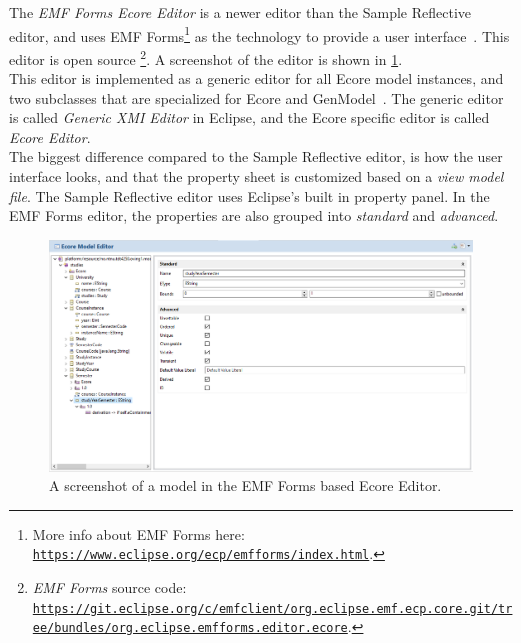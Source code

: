 The \textit{EMF Forms Ecore Editor} is a newer editor than the Sample Reflective editor, and uses EMF Forms\footnote{More info about EMF Forms here: \href{https://www.eclipse.org/ecp/emfforms/index.html}{\nolinkurl{https://www.eclipse.org/ecp/emfforms/index.html}}.} as the technology to provide a user interface~\cite{eclipsesourceEMFFormsEditors2016}.
This editor is \gls{open source}%
\footnote{\textit{EMF Forms} source code: \href{https://git.eclipse.org/c/emfclient/org.eclipse.emf.ecp.core.git/tree/bundles/org.eclipse.emfforms.editor.ecore}{\nolinkurl{https://git.eclipse.org/c/emfclient/org.eclipse.emf.ecp.core.git/tree/bundles/org.eclipse.emfforms.editor.ecore}}.}.
A screenshot of the editor is shown in \cref{fig:emf-forms-ecore-editor}.\\

This editor is implemented as a generic editor for all \gls{Ecore} model instances, and two subclasses that are specialized for \gls{Ecore} and GenModel~\cite{eclipsesourceEMFFormsEditors2016}.
The generic editor is called \textit{Generic XMI Editor} in \gls{Eclipse}, and the \gls{Ecore} specific editor is called \textit{Ecore Editor}.\\

The biggest difference compared to the Sample Reflective editor, is how the user interface looks, and that the property sheet is customized based on a \textit{view model file}.
The Sample Reflective editor uses \gls{Eclipse}'s built in property panel.
In the EMF Forms editor, the properties are also grouped into \textit{standard} and \textit{advanced}.

\begin{figure}[htbp]  %
  \centering
  \includegraphics[width=\textwidth]{figures/pre-project/ecore-eclipse-emf-forms-model-editor.png}
  \caption[EMF Forms Ecore Editor]{A screenshot of a model in the EMF Forms based Ecore Editor.}\label{fig:emf-forms-ecore-editor}
\end{figure}

